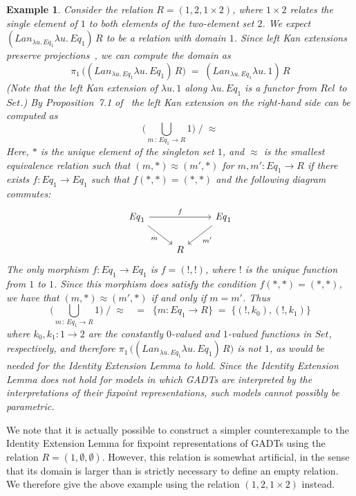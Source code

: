 \documentclass[submission,copyright,creativecommons]{eptcs}
\newtheorem{example}[thm]{Example}
\begin{document}
\begin{example}
Consider the relation $R = (1, 2, 1 \times 2)$, where $1 \times 2$
relates the single element of $1$ to both elements of the two-element
set $2$. We expect $(\mathit{Lan}_{\lambda u\!.\,\mathit{Eq}_1}
\lambda u\!.\,\mathit{Eq}_1)\, R$ to be a relation with domain
$1$. Since left Kan extensions preserve projections~\cite{rie16}, we
can compute the domain as
\[\pi_1\,\big( (\mathit{Lan}_{\lambda u\!.\,\mathit{Eq}_1} \lambda
u\!.\,\mathit{Eq}_1) \, R \big)\;=\; (\mathit{Lan}_{\lambda
u\!.\,\mathit{Eq}_1} \lambda u\!. \,1)\, R\] (Note that the left Kan
 extension of $\lambda u\!. \,1$ along $\lambda u\!.\,\mathit{Eq}_1$
 is a functor from $\mathit{Rel}$ to $\mathit{Set}$.) By
 Proposition~7.1 of~\cite{blw03} the left Kan extension on the
 right-hand side can be computed as
\[ \big( \bigcup_{m\, :\, \mathit{Eq}_1 \to R} 1 \big) \; /\; \approx\]
Here, $*$ is the unique element of the singleton set $1$, and $\approx$
is the smallest equivalence relation such that $(m,\ast) \approx
(m',\ast)$ for $m, m' : \mathit{Eq}_1 \to R$ if there exists $f :
\mathit{Eq}_1 \to \mathit{Eq}_1$ such that $f (\ast, \ast) = (\ast,
\ast)$ and the following diagram commutes:
\[
\begin{tikzcd}
\mathit{Eq}_1 \ar[rr, "{f}"] \ar[dr, "m"']
&&\mathit{Eq}_1 \ar[dl, "m'"] \\
&R
\end{tikzcd}
\]
The only morphism $f : \mathit{Eq}_1 \to \mathit{Eq}_1$ is $f = (!,
!)$, where $!$ is the unique function from $1$ to $1$.  Since this
morphism does satisfy the condition $f (\ast, \ast) = (\ast, \ast)$,
we have that $(m,\ast) \approx (m',\ast)$ if and only if $m =
m'$. Thus
\[ \big( \bigcup_{m\, :\,
  \mathit{Eq}_1 \to R} 1 \big) \; /\; \approx \;\;\; = \;\; \{m :
\mathit{Eq}_1 \to R\} \;=\; \{(!, k_0), (!, k_1)\}\] where $k_0, k_1 :
1 \to 2$ are the constantly $0$-valued and $1$-valued functions in
$\mathit{Set}$, respectively, and therefore $\pi_1\,\big(
(\mathit{Lan}_{\lambda u\!.\,\mathit{Eq}_1} \lambda
u\!.\,\mathit{Eq}_1) \, R \big)$ is not $1$, as would be needed for
the Identity Extension Lemma to hold.  Since the Identity Extension
Lemma does not hold for models in which GADTs are interpreted by the
interpretations of their fixpoint representations, such models cannot
possibly be parametric.
\end{example}

\vspace*{-0.05in}

We note that it is actually possible to construct a simpler
counterexample to the Identity Extension Lemma for fixpoint
representations of GADTs using the relation $R = (1,\emptyset,
\emptyset)$. However, this relation is somewhat artificial, in the
sense that its domain is larger than is strictly necessary to define
an empty relation. We therefore give the above example using the
relation $(1,2,1 \times 2)$ instead.
\end{document}
